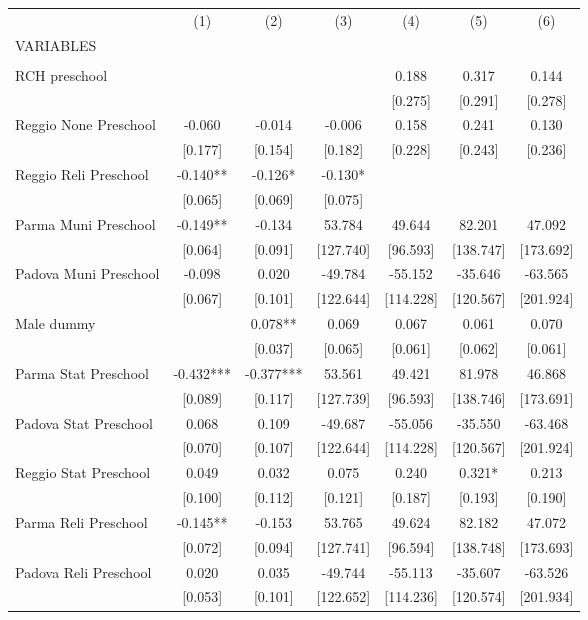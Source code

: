 \begin{tabular}{lcccccc} \hline
 & (1) & (2) & (3) & (4) & (5) & (6) \\
VARIABLES &  &  &  &  &  &  \\ \hline
 &  &  &  &  &  &  \\
RCH preschool &  &  &  & 0.188 & 0.317 & 0.144 \\
 &  &  &  & [0.275] & [0.291] & [0.278] \\
Reggio None Preschool & -0.060 & -0.014 & -0.006 & 0.158 & 0.241 & 0.130 \\
 & [0.177] & [0.154] & [0.182] & [0.228] & [0.243] & [0.236] \\
Reggio Reli Preschool & -0.140** & -0.126* & -0.130* &  &  &  \\
 & [0.065] & [0.069] & [0.075] &  &  &  \\
Parma Muni Preschool & -0.149** & -0.134 & 53.784 & 49.644 & 82.201 & 47.092 \\
 & [0.064] & [0.091] & [127.740] & [96.593] & [138.747] & [173.692] \\
Padova Muni Preschool & -0.098 & 0.020 & -49.784 & -55.152 & -35.646 & -63.565 \\
 & [0.067] & [0.101] & [122.644] & [114.228] & [120.567] & [201.924] \\
Male dummy &  & 0.078** & 0.069 & 0.067 & 0.061 & 0.070 \\
 &  & [0.037] & [0.065] & [0.061] & [0.062] & [0.061] \\
Parma Stat Preschool & -0.432*** & -0.377*** & 53.561 & 49.421 & 81.978 & 46.868 \\
 & [0.089] & [0.117] & [127.739] & [96.593] & [138.746] & [173.691] \\
Padova Stat Preschool & 0.068 & 0.109 & -49.687 & -55.056 & -35.550 & -63.468 \\
 & [0.070] & [0.107] & [122.644] & [114.228] & [120.567] & [201.924] \\
Reggio Stat Preschool & 0.049 & 0.032 & 0.075 & 0.240 & 0.321* & 0.213 \\
 & [0.100] & [0.112] & [0.121] & [0.187] & [0.193] & [0.190] \\
Parma Reli Preschool & -0.145** & -0.153 & 53.765 & 49.624 & 82.182 & 47.072 \\
 & [0.072] & [0.094] & [127.741] & [96.594] & [138.748] & [173.693] \\
Padova Reli Preschool & 0.020 & 0.035 & -49.744 & -55.113 & -35.607 & -63.526 \\
 & [0.053] & [0.101] & [122.652] & [114.236] & [120.574] & [201.934] \\

\end{tabular}
